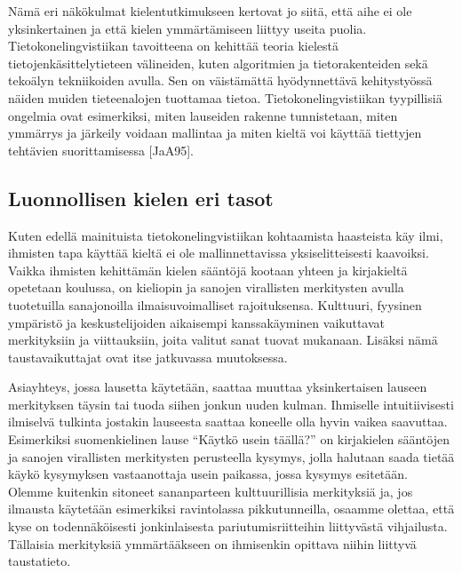 \documentclass[finnish]{tktltiki2}
\theoremstyle{definition}
\theoremstyle{remark}
\begin{document}
Nämä eri näkökulmat kielentutkimukseen kertovat jo siitä, että aihe ei ole yksinkertainen ja että kielen ymmärtämiseen liittyy useita puolia. Tietokonelingvistiikan tavoitteena on kehittää teoria kielestä tietojenkäsittelytieteen välineiden, kuten algoritmien ja tietorakenteiden sekä tekoälyn tekniikoiden avulla. Sen on väistämättä hyödynnettävä kehitystyössä näiden muiden tieteenalojen tuottamaa tietoa. Tietokonelingvistiikan tyypillisiä ongelmia ovat esimerkiksi, miten lauseiden rakenne tunnistetaan, miten ymmärrys ja järkeily voidaan mallintaa ja miten kieltä voi käyttää tiettyjen tehtävien suorittamisessa [JaA95].

\subsection{Luonnollisen kielen eri tasot}

Kuten edellä mainituista tietokonelingvistiikan kohtaamista haasteista käy ilmi, ihmisten tapa käyttää kieltä ei ole mallinnettavissa yksiselitteisesti kaavoiksi. Vaikka ihmisten kehittämän kielen sääntöjä kootaan yhteen ja kirjakieltä opetetaan koulussa, on kieliopin ja sanojen virallisten merkitysten avulla tuotetuilla sanajonoilla ilmaisuvoimalliset rajoituksensa. Kulttuuri, fyysinen ympäristö ja keskustelijoiden aikaisempi kanssakäyminen vaikuttavat merkityksiin ja viittauksiin, joita valitut sanat tuovat mukanaan. Lisäksi nämä taustavaikuttajat ovat itse jatkuvassa muutoksessa. 
 
Asiayhteys, jossa lausetta käytetään, saattaa muuttaa yksinkertaisen lauseen merkityksen täysin tai tuoda siihen jonkun uuden kulman. Ihmiselle intuitiivisesti ilmiselvä tulkinta jostakin lauseesta saattaa koneelle olla hyvin vaikea saavuttaa. Esimerkiksi suomenkielinen lause “Käytkö usein täällä?” on kirjakielen sääntöjen ja sanojen virallisten merkitysten perusteella kysymys, jolla halutaan saada tietää käykö kysymyksen vastaanottaja usein paikassa, jossa kysymys esitetään. Olemme kuitenkin sitoneet sananparteen kulttuurillisia merkityksiä ja, jos ilmausta käytetään esimerkiksi ravintolassa pikkutunneilla, osaamme olettaa, että kyse on todennäköisesti jonkinlaisesta pariutumisriitteihin liittyvästä vihjailusta. Tällaisia merkityksiä ymmärtääkseen on ihmisenkin opittava niihin liittyvä taustatieto. 
 
\end{document}
